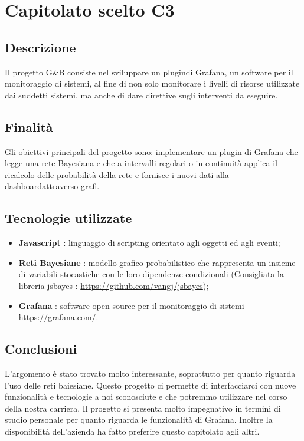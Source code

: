 \section{Capitolato scelto C3}
	\subsection{Descrizione}
		Il progetto G\&B consiste nel sviluppare un plugin\pedice di Grafana\pedice, un software per il monitoraggio di sistemi, al fine di non solo monitorare i livelli di risorse utilizzate dai suddetti sistemi, ma anche di dare direttive sugli interventi da eseguire.
	\subsection{Finalità}
		Gli obiettivi principali del progetto sono: implementare un plugin di Grafana che legge una rete Bayesiana e che a intervalli regolari o in continuità applica il ricalcolo delle probabilità della rete e fornisce i nuovi dati alla dashboard\pedice attraverso grafi.
	\subsection{Tecnologie utilizzate}
		\begin{itemize}
			\item \textbf{Javascript\pedice} : linguaggio di scripting orientato agli oggetti ed agli eventi;
			\item \textbf{Reti Bayesiane\pedice} : modello grafico probabilistico che rappresenta un insieme di variabili stocastiche con le loro dipendenze condizionali (Consigliata la libreria jsbayes : \url{https://github.com/vangj/jsbayes});
			\item \textbf{Grafana} : software open source per il monitoraggio di sistemi \url{https://grafana.com/}.
		\end{itemize}
	\subsection{Conclusioni}
		L'argomento è stato trovato molto interessante, soprattutto per quanto riguarda l'uso delle reti baiesiane. Questo progetto ci permette di interfacciarci con nuove funzionalità e tecnologie a noi sconosciute e che potremmo utilizzare nel corso della nostra carriera.
		Il progetto si presenta molto impegnativo in termini di studio personale per quanto riguarda le funzionalità di Grafana.
		Inoltre la disponibilità dell'azienda ha fatto preferire questo capitolato agli altri.
